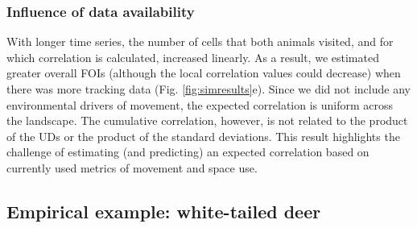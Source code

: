 \documentclass[letterpaper]{article}
\begin{document}
\subsubsection*{Influence of data availability}
With longer time series, the number of cells that both animals visited, and for which correlation is calculated, increased linearly. As a result, we estimated greater overall FOIs (although the local correlation values could decrease) when there was more tracking data (Fig. \ref{fig:simresults}e). 
Since we did not include any environmental drivers of movement, the expected correlation is uniform across the landscape. The cumulative correlation, however, is not related to the product of the UDs or the product of the standard deviations. This result highlights the challenge of estimating (and predicting) an expected correlation based on currently used metrics of movement and space use.


\subsection*{Empirical example: white-tailed deer}
\end{document}
